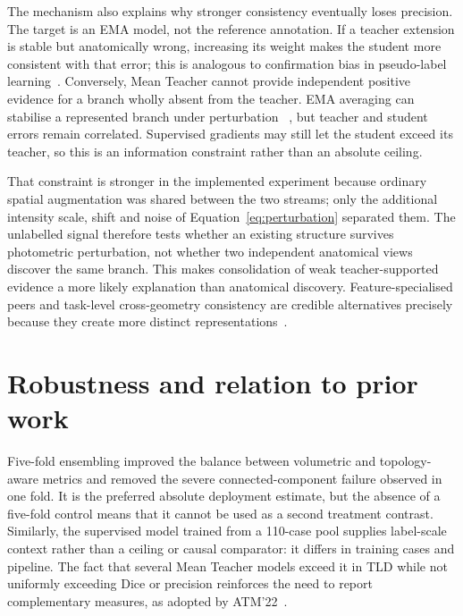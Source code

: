 The mechanism also explains why stronger consistency eventually loses precision. The target is
an EMA model, not the reference annotation. If a teacher extension is stable but anatomically
wrong, increasing its weight makes the student more consistent with that error; this is analogous
to confirmation bias in pseudo-label learning~\cite{arazo2020confirmation}. Conversely, Mean
Teacher cannot provide independent positive evidence for a branch wholly absent from the teacher.
EMA averaging can stabilise a represented branch under perturbation
~\cite{tarvainen2017mean,laine2017temporal,yu2019uamt}, but teacher and student errors remain
correlated. Supervised gradients may still let the student exceed its teacher, so this is an
information constraint rather than an absolute ceiling.

That constraint is stronger in the implemented experiment because ordinary spatial augmentation
was shared between the two streams; only the additional intensity scale, shift and noise of
Equation~\eqref{eq:perturbation} separated them. The unlabelled signal therefore tests whether an
existing structure survives photometric perturbation, not whether two independent anatomical
views discover the same branch. This makes consolidation of weak teacher-supported evidence a
more likely explanation than anatomical discovery. Feature-specialised peers and task-level
cross-geometry consistency are credible alternatives precisely because they create more distinct
representations~\cite{gu2023featurespecialisation,zhu2024crossgeometry}.

\section{Robustness and relation to prior work}

\ifshowcurrentcontrol
\begin{currentcontrolroute}
Five-fold ensembling improved the balance between volumetric and topology-aware metrics and
removed the severe connected-component failure observed in one fold. It is the preferred
absolute deployment estimate, but the absence of a five-fold control means that it cannot be
used as a second treatment contrast. Similarly, the supervised model trained from a 110-case
pool supplies label-scale context rather than a ceiling or causal comparator: it differs in
training cases and pipeline. The fact that several Mean Teacher models exceed it in TLD while
not uniformly exceeding Dice or precision reinforces the need to report complementary measures,
as adopted by ATM'22~\cite{zhang2023atm22}.
\end{currentcontrolroute}
\fi

